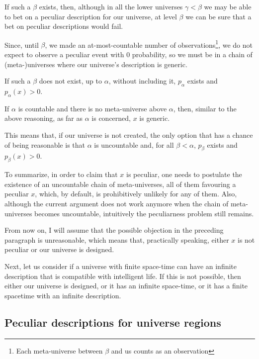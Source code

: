 \documentclass[a4paper
,draft
]{article}
\newcommand{\svn}[2][]{\todo[author=Virgil,color=red!25!white,#1]{#2}}
\newcommand{\ghilimele}[1]{``#1"}
\begin{document}
If such a $\beta$ exists, then, although in all the lower universes
$\gamma < \beta$ we may be able to bet on a peculiar description for our
universe, at level $\beta$ we can be sure that a bet on peculiar descriptions
would fail.

Since, until $\beta$, we made an at-most-countable number of
observations\footnote{Each meta-universe between $\beta$ and us counts as an
observation}, we
do not expect to observe a peculiar event with $0$ probability, so we must be
in a chain of (meta-)universes where our universe's description is
generic.
\svn{+quote. Qhat did I mean by \ghilimele{quote}?}

If such a $\beta$ does not exist, up to $\alpha$, without including it,
$p_\alpha$ exists and $p_\alpha(x) > 0$.

If $\alpha$ is countable and there is no meta-universe above $\alpha$,
then, similar to the above reasoning, as far as $\alpha$ is concerned,
$x$ is generic.

This means that, if our universe is not created, the only option that
has a chance of being reasonable is that $\alpha$ is uncountable and,
for all $\beta < \alpha$, $p_\beta$ exists and $p_\beta(x) > 0$.

To summarize, in order to claim that $x$ is peculiar, one needs to postulate the
existence of an uncountable chain of meta-universes, all of them favouring a
peculiar $x$, which, by default, is prohibitively unlikely for any of them.
Also, although the
current argument does not work anymore when the chain of
meta-universes becomes uncountable, intuitively the peculiarness problem
still remains.

From now on, I will assume that the possible objection in the preceding
paragraph is unreasonable, which means that, practically speaking,
either $x$ is not peculiar or our universe is designed.

Next, let us consider if a universe with finite space-time can have an
infinite description that is compatible with intelligent life. If this is not
possible, then either our universe is designed, or it has an infinite
space-time, or it has a finite spacetime with an infinite description.

\subsection{Peculiar descriptions for universe regions}
\end{document}
